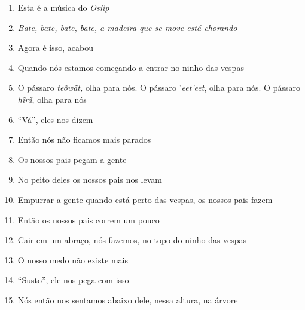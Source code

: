 \begin{enumerate}
 \item Esta é a música do \textit{Osiip}

 \item\textit{Bate, bate, bate, bate, a madeira que se move está chorando}

 \item Agora é isso, acabou

 \begin{center}\end{center}

 \item Quando nós estamos começando a entrar no ninho das vespas

 \item O pássaro \textit{teõwãt,} olha para nós. O pássaro '\textit{eet'eet},
 olha para nós. O pássaro \textit{hĩrã}, olha para nós

 \item ``Vá'', eles nos dizem

 \item Então nós não ficamos mais parados

 \begin{center}\end{center}

 \item Os nossos pais pegam a gente

 \item No peito deles os nossos pais nos levam

 \item Empurrar a gente quando está perto das vespas, os nossos pais fazem

 \item Então os nossos pais correm um pouco

 \begin{center}\end{center}

 \item Cair em um abraço, nós fazemos, no topo do ninho das vespas

 \item O nosso medo não existe mais

 \item ``Susto'', ele nos pega com isso

 \item Nós então nos sentamos abaixo dele, nessa altura, na árvore


\end{enumerate}
